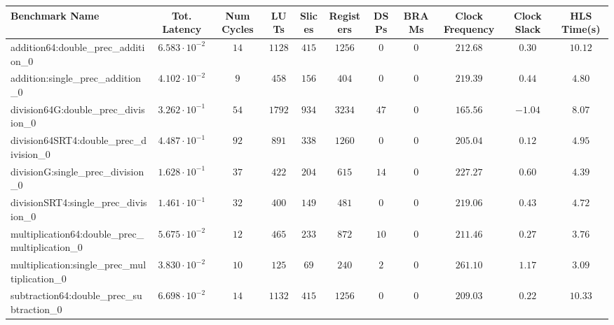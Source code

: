 \begin{tabular}{|l|c|c|c|c|c|c|c|c|c|c|}
\hline
Benchmark Name                                   & Tot. Latency            & Num Cycles & LUTs     & Slices   & Registers & DSPs   & BRAMs & Clock Frequency & Clock Slack & HLS Time(s) \\
\hline
addition64:double\_prec\_addition\_0             & $ 6.583 \cdot 10^{-2} $ & $ 14     $ & $ 1128 $ & $ 415  $ & $ 1256  $ & $ 0  $ & $ 0 $ & $ 212.68      $ & $ 0.30    $ & $ 10.12   $ \\
addition:single\_prec\_addition\_0               & $ 4.102 \cdot 10^{-2} $ & $ 9      $ & $ 458  $ & $ 156  $ & $ 404   $ & $ 0  $ & $ 0 $ & $ 219.39      $ & $ 0.44    $ & $ 4.80    $ \\
division64G:double\_prec\_division\_0            & $ 3.262 \cdot 10^{-1} $ & $ 54     $ & $ 1792 $ & $ 934  $ & $ 3234  $ & $ 47 $ & $ 0 $ & $ 165.56      $ & $ -1.04   $ & $ 8.07    $ \\
division64SRT4:double\_prec\_division\_0         & $ 4.487 \cdot 10^{-1} $ & $ 92     $ & $ 891  $ & $ 338  $ & $ 1260  $ & $ 0  $ & $ 0 $ & $ 205.04      $ & $ 0.12    $ & $ 4.95    $ \\
divisionG:single\_prec\_division\_0              & $ 1.628 \cdot 10^{-1} $ & $ 37     $ & $ 422  $ & $ 204  $ & $ 615   $ & $ 14 $ & $ 0 $ & $ 227.27      $ & $ 0.60    $ & $ 4.39    $ \\
divisionSRT4:single\_prec\_division\_0           & $ 1.461 \cdot 10^{-1} $ & $ 32     $ & $ 400  $ & $ 149  $ & $ 481   $ & $ 0  $ & $ 0 $ & $ 219.06      $ & $ 0.43    $ & $ 4.72    $ \\
multiplication64:double\_prec\_multiplication\_0 & $ 5.675 \cdot 10^{-2} $ & $ 12     $ & $ 465  $ & $ 233  $ & $ 872   $ & $ 10 $ & $ 0 $ & $ 211.46      $ & $ 0.27    $ & $ 3.76    $ \\
multiplication:single\_prec\_multiplication\_0   & $ 3.830 \cdot 10^{-2} $ & $ 10     $ & $ 125  $ & $ 69   $ & $ 240   $ & $ 2  $ & $ 0 $ & $ 261.10      $ & $ 1.17    $ & $ 3.09    $ \\
subtraction64:double\_prec\_subtraction\_0       & $ 6.698 \cdot 10^{-2} $ & $ 14     $ & $ 1132 $ & $ 415  $ & $ 1256  $ & $ 0  $ & $ 0 $ & $ 209.03      $ & $ 0.22    $ & $ 10.33   $ \\

\end{tabular}
